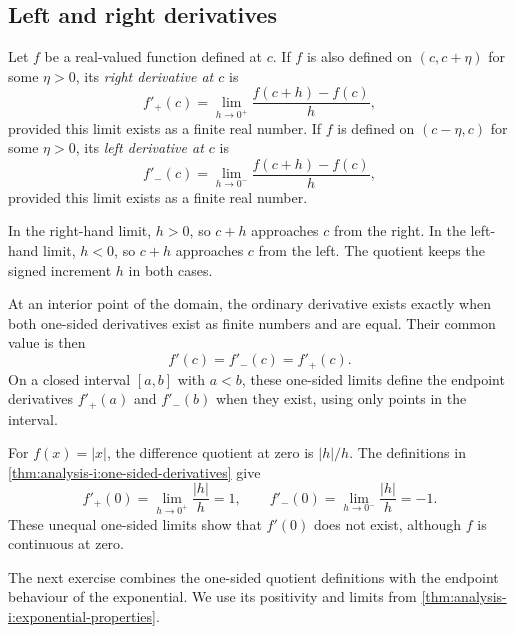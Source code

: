\subsection{Left and right derivatives}

\begin{definition}
  \label{thm:analysis-i:one-sided-derivatives}
  Let $f$ be a real-valued function defined at $c$.
  If $f$ is also defined on $(c,c+\eta)$ for some $\eta>0$, its
  \emph{right derivative at $c$} is
  \[
    f'_+(c)=\lim_{h\to0^+}\frac{f(c+h)-f(c)}{h},
  \]
  provided this limit exists as a finite real number.
  If $f$ is defined on $(c-\eta,c)$ for some $\eta>0$, its
  \emph{left derivative at $c$} is
  \[
    f'_-(c)=\lim_{h\to0^-}\frac{f(c+h)-f(c)}{h},
  \]
  provided this limit exists as a finite real number.
\end{definition}

In the right-hand limit, $h>0$, so $c+h$ approaches $c$ from the right.
In the left-hand limit, $h<0$, so $c+h$ approaches $c$ from the left.
The quotient keeps the signed increment $h$ in both cases.

At an interior point of the domain, the ordinary derivative exists
exactly when both one-sided derivatives exist as finite numbers and
are equal. Their common value is then
\[
  f'(c)=f'_-(c)=f'_+(c).
\]
On a closed interval $[a,b]$ with $a<b$, these one-sided limits define
the endpoint derivatives $f'_+(a)$ and $f'_-(b)$ when they exist, using
only points in the interval.

\begin{example}
  \label{ex:analysis-i:absolute-value-derivative}
  For $f(x)=|x|$, the difference quotient at zero is $|h|/h$.
  The definitions in
  \autoref{thm:analysis-i:one-sided-derivatives} give
  \[
    f'_+(0)=\lim_{h\to0^+}\frac{|h|}{h}=1,\qquad
    f'_-(0)=\lim_{h\to0^-}\frac{|h|}{h}=-1.
  \]
  These unequal one-sided limits show that $f'(0)$ does not exist,
  although $f$ is continuous at zero.
\end{example}
The next exercise combines the one-sided quotient definitions with the
endpoint behaviour of the exponential. We use its positivity and limits
from \autoref{thm:analysis-i:exponential-properties}.


